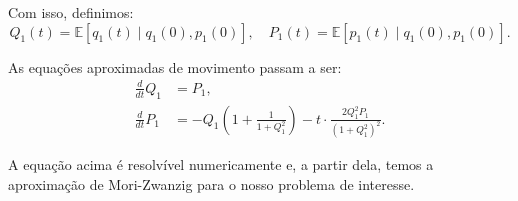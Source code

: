 \documentclass[12pt]{article}
\begin{document}
Com isso, definimos:
\begin{equation*}
    Q_1(t) = \mathbb{E}[q_1(t) \mid q_1(0), p_1(0)], \quad P_1(t) = \mathbb{E}[p_1(t) \mid q_1(0), p_1(0)].
\end{equation*}

As equações aproximadas de movimento passam a ser:
\begin{align*}
    \frac{d}{dt} Q_1 &= P_1,\\
    \frac{d}{dt} P_1 &= -Q_1\left(1 + \frac{1}{1 + Q_1^2} \right) - t \cdot \frac{2 Q_1^2 P_1}{(1 + Q_1^2)^2}.
\end{align*}

A equação acima é resolvível numericamente e, a partir dela, temos a aproximação de Mori-Zwanzig para o nosso problema de interesse.
\newpage
\nocite{*}
\printbibliography
\end{document}
